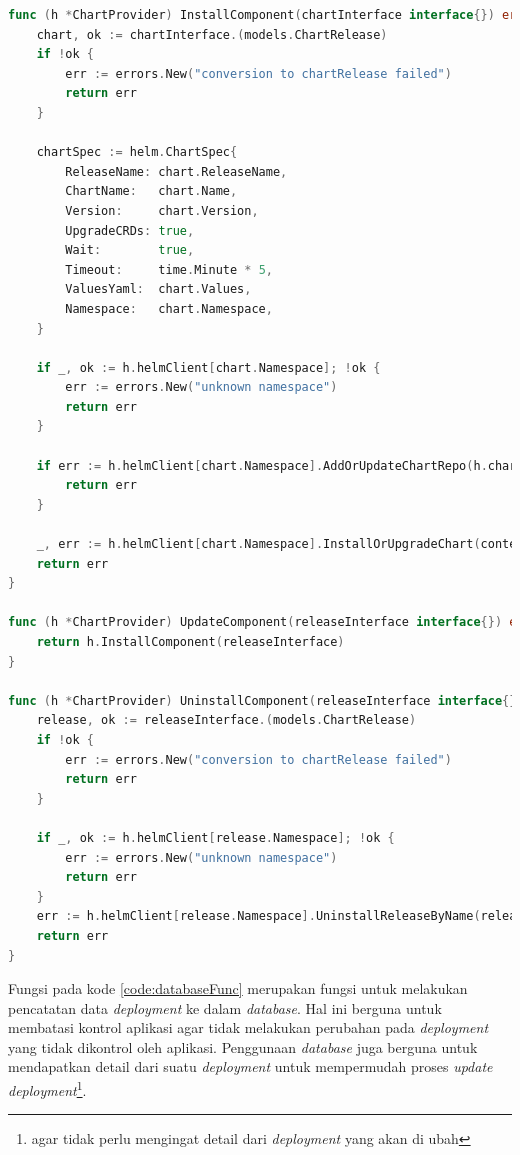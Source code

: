 \begin{lstlisting}[frame=single,language=Go,caption={Fungsi install, update, dan delete pada Helm handler},label={code:helmFunc}]
func (h *ChartProvider) InstallComponent(chartInterface interface{}) error {
	chart, ok := chartInterface.(models.ChartRelease)
	if !ok {
		err := errors.New("conversion to chartRelease failed")
		return err
	}

	chartSpec := helm.ChartSpec{
		ReleaseName: chart.ReleaseName,
		ChartName:   chart.Name,
		Version:     chart.Version,
		UpgradeCRDs: true,
		Wait:        true,
		Timeout:     time.Minute * 5,
		ValuesYaml:  chart.Values,
		Namespace:   chart.Namespace,
	}

	if _, ok := h.helmClient[chart.Namespace]; !ok {
		err := errors.New("unknown namespace")
		return err
	}

	if err := h.helmClient[chart.Namespace].AddOrUpdateChartRepo(h.chartRepo); err != nil {
		return err
	}

	_, err := h.helmClient[chart.Namespace].InstallOrUpgradeChart(context.Background(), &chartSpec)
	return err
}

func (h *ChartProvider) UpdateComponent(releaseInterface interface{}) error {
	return h.InstallComponent(releaseInterface)
}

func (h *ChartProvider) UninstallComponent(releaseInterface interface{}) error {
	release, ok := releaseInterface.(models.ChartRelease)
	if !ok {
		err := errors.New("conversion to chartRelease failed")
		return err
	}

	if _, ok := h.helmClient[release.Namespace]; !ok {
		err := errors.New("unknown namespace")
		return err
	}
	err := h.helmClient[release.Namespace].UninstallReleaseByName(release.ReleaseName)
	return err
}
\end{lstlisting}

Fungsi pada kode \ref{code:databaseFunc} merupakan fungsi untuk melakukan pencatatan data \textit{deployment} ke dalam \textit{database}. Hal ini berguna untuk membatasi kontrol aplikasi agar tidak melakukan perubahan pada \textit{deployment} yang tidak dikontrol oleh aplikasi. Penggunaan \textit{database} juga berguna untuk mendapatkan detail dari suatu \textit{deployment} untuk mempermudah proses \textit{update} \textit{deployment}\footnote{agar tidak perlu mengingat detail dari \textit{deployment} yang akan di ubah}.

